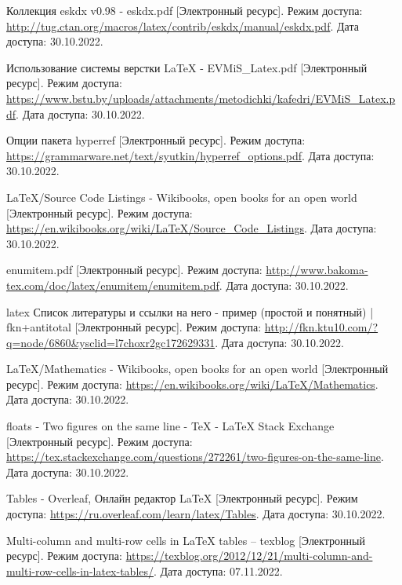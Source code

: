   \begin{thebibliography}{}
    Коллекция eskdx v0.98 - eskdx.pdf
    [Электронный ресурс].
    Режим доступа: \url{http://tug.ctan.org/macros/latex/contrib/eskdx/manual/eskdx.pdf}.
    Дата доступа: 30.10.2022.
  
    Использование системы верстки LaTeX - EVMiS\_Latex.pdf
    [Электронный ресурс].
    Режим доступа: \url{https://www.bstu.by/uploads/attachments/metodichki/kafedri/EVMiS_Latex.pdf}.
    Дата доступа: 30.10.2022.
  
    Опции пакета hyperref
    [Электронный ресурс].
    Режим доступа: \url{https://grammarware.net/text/syutkin/hyperref_options.pdf}.
    Дата доступа: 30.10.2022.
  
    LaTeX/Source Code Listings - Wikibooks, open books for an open world
    [Электронный ресурс].
    Режим доступа: \url{https://en.wikibooks.org/wiki/LaTeX/Source_Code_Listings}.
    Дата доступа: 30.10.2022.
  
    enumitem.pdf
    [Электронный ресурс].
    Режим доступа: \url{http://www.bakoma-tex.com/doc/latex/enumitem/enumitem.pdf}.
    Дата доступа: 30.10.2022.
  
    latex Список литературы и ссылки на него - пример (простой и понятный) | fkn+antitotal
    [Электронный ресурс].
    Режим доступа: \url{http://fkn.ktu10.com/?q=node/6860&ysclid=l7choxr2gc172629331}.
    Дата доступа: 30.10.2022.

    LaTeX/Mathematics - Wikibooks, open books for an open world
    [Электронный ресурс].
    Режим доступа: \url{https://en.wikibooks.org/wiki/LaTeX/Mathematics}.
    Дата доступа: 30.10.2022.

    floats - Two figures on the same line - TeX - LaTeX Stack Exchange
    [Электронный ресурс].
    Режим доступа: \url{https://tex.stackexchange.com/questions/272261/two-figures-on-the-same-line}.
    Дата доступа: 30.10.2022.

    Tables - Overleaf, Онлайн редактор LaTeX
    [Электронный ресурс].
    Режим доступа: \url{https://ru.overleaf.com/learn/latex/Tables}.
    Дата доступа: 30.10.2022.

    Multi-column and multi-row cells in LaTeX tables – texblog
    [Электронный ресурс].
    Режим доступа: \url{https://texblog.org/2012/12/21/multi-column-and-multi-row-cells-in-latex-tables/}.
    Дата доступа: 07.11.2022.   
  \end{thebibliography}
\endgroup

\newpage
